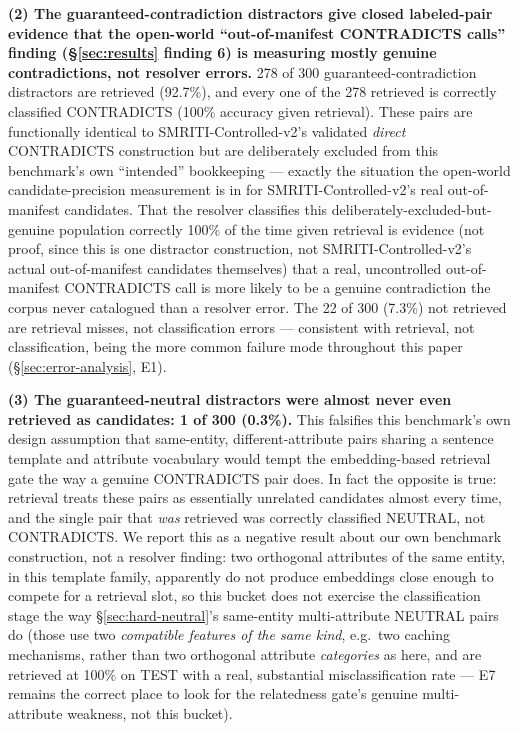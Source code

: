 \textbf{(2) The guaranteed-contradiction distractors give closed
labeled-pair evidence that the open-world ``out-of-manifest CONTRADICTS
calls''
finding (\S\ref{sec:results} finding 6) is measuring mostly genuine
contradictions, not resolver errors.} 278 of 300 guaranteed-contradiction
distractors are retrieved (92.7\%), and every one of the 278 retrieved
is correctly classified CONTRADICTS (100\% accuracy given retrieval).
These pairs are functionally identical to SMRITI-Controlled-v2's
validated \emph{direct} CONTRADICTS construction but are deliberately
excluded from this benchmark's own ``intended'' bookkeeping --- exactly
the situation the open-world candidate-precision measurement is in for
SMRITI-Controlled-v2's real out-of-manifest candidates. That the
resolver classifies this deliberately-excluded-but-genuine population
correctly 100\% of the time given retrieval is evidence (not proof, since
this is one distractor construction, not SMRITI-Controlled-v2's actual
out-of-manifest candidates themselves) that a real, uncontrolled
out-of-manifest CONTRADICTS call is more likely to be a genuine
contradiction the corpus never catalogued than a resolver error. The 22
of 300 (7.3\%) not retrieved are retrieval misses, not classification
errors --- consistent with retrieval, not classification, being the more
common failure mode throughout this paper (\S\ref{sec:error-analysis},
E1).

\textbf{(3) The guaranteed-neutral distractors were almost never even
retrieved as candidates: 1 of 300 (0.3\%).} This falsifies this
benchmark's own design assumption that same-entity, different-attribute
pairs sharing a sentence template and attribute vocabulary would tempt
the embedding-based retrieval gate the way a genuine CONTRADICTS pair
does. In fact the opposite is true: retrieval treats these pairs as
essentially unrelated candidates almost every time, and the single pair
that \emph{was} retrieved was correctly classified NEUTRAL, not
CONTRADICTS. We report this as a negative result about our own
benchmark construction, not a resolver finding: two orthogonal attributes
of the same entity, in this template family, apparently do not produce
embeddings close enough to compete for a retrieval slot, so this bucket
does not exercise the classification stage the way \S\ref{sec:hard-neutral}'s
same-entity multi-attribute NEUTRAL pairs do (those use two
\emph{compatible features of the same kind}, e.g.\ two caching
mechanisms, rather than two orthogonal attribute \emph{categories} as
here, and are retrieved at 100\% on TEST with a real, substantial
misclassification rate --- E7 remains the correct place to look for the
relatedness gate's genuine multi-attribute weakness, not this bucket).

